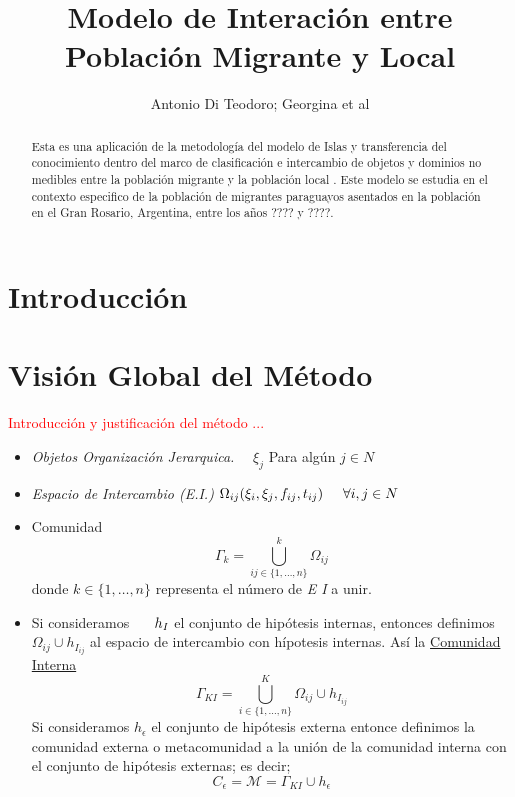 \documentclass[]{article}
\title{Modelo de Interaci\'on entre Poblaci\'on Migrante y Local}
\author{Antonio Di Teodoro; Georgina et al}
\begin{document}
\maketitle

\begin{abstract}
Esta es una aplicaci\'on de la metodolog\'ia del modelo de Islas y transferencia del conocimiento dentro del marco de clasificaci\'on e intercambio de objetos y dominios no medibles entre la población migrante y la poblaci\'on local . Este modelo se estudia en el contexto especifico de la poblaci\'on  de migrantes paraguayos asentados en la poblaci\'on en el Gran Rosario, Argentina, entre los años ???? y ????.
\end{abstract}

\section{Introducci\'on}

\section{Visi\'on Global del M\'etodo}

\textcolor{red}{Introducci\'on y justificaci\'on del m\'etodo ...}

\begin{itemize}
	\item \emph{Objetos  Organizaci\'on  Jerarquica.}   \ \  $\xi_{j}$ Para alg\'un   ${j \in N}$
	\item \emph{Espacio de  Intercambio (E.I.)}  \hspace{1cm} \begin{math} \Omega_{i j} ( \xi_{i}, \xi_{j}, f_{i j}, t_{i j}) \hspace{0.5cm} \forall i , j \in N \end{math}
	\item Comunidad
	\begin{equation}
	\Gamma_k = \bigcup^{k}_{i j \in \{1,\ldots,n\}}\Omega_{i j}
	\end{equation}
	donde  $ k \in \{1,\ldots,n\}$ representa el n\'umero de \emph{E I} a unir.
	\item Si  consideramos $ \hspace{0.5cm} h_I$ el conjunto de hip\'otesis internas, entonces definimos $\Omega_{i j} \cup h_{I_{i j}}$ al espacio de intercambio con h\'ipotesis internas. As\'i la \underline{Comunidad Interna}
	\begin{equation}
	\Gamma_{KI}=\bigcup^{K}_{i \in \{1,\ldots,n\}} \Omega_{i j}\cup h_{I_{i j}}
	\end{equation}
	Si consideramos $h_\epsilon$ el conjunto de hip\'otesis externa entonce definimos  la comunidad  externa o metacomunidad a la unión de la comunidad interna con el conjunto de hip\'otesis externas; es decir;
	\begin{equation}
	C_\epsilon =\mathcal{M} = \Gamma_{KI}\cup h_\epsilon
	\end{equation}
	
\end{itemize}
\end{document}
